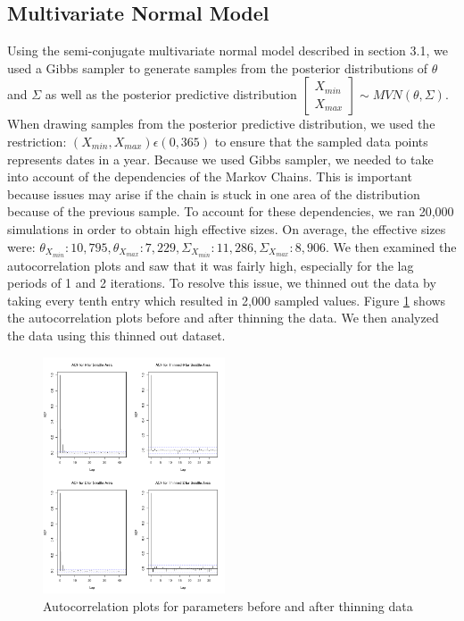 \documentclass{article}
\begin{document}
\subsection{Multivariate Normal Model}
Using the semi-conjugate multivariate normal model described in section 3.1, we used a Gibbs sampler to generate samples from the posterior distributions of $\theta$ and $\Sigma$ as well as the posterior predictive distribution $\begin{bmatrix} X_{min} \\ X_{max} \end{bmatrix}  \sim MVN(\theta, \Sigma)$. When drawing samples from the posterior predictive distribution, we used the restriction: $(X_{min} ,X_{max}) \epsilon (0,365)$ to ensure that the sampled data points represents dates in a year. Because we used Gibbs sampler, we needed to take into account of the dependencies of the Markov Chains. This is important because issues may arise if the chain is stuck in one area of the distribution because of the previous sample. To account for these dependencies, we ran 20,000 simulations in order to obtain high effective sizes. On average, the effective sizes were: $\theta_{X_{min}} : 10,795,  \theta_{X_{max}}: 7,229, \Sigma_{X_{min}}: 11,286, \Sigma_{X_{max}}: 8,906$. We then examined the autocorrelation plots and saw that it was fairly high, especially for the lag periods of 1 and 2 iterations. To resolve this issue, we thinned out the data by taking every tenth entry which resulted in 2,000 sampled values. Figure \ref{acfPlot} shows the autocorrelation plots before and after thinning the data. We then analyzed the data using this thinned out dataset.

\begin{figure}[H]
\includegraphics[width = .6\textwidth, height = 7cm]{acfplots}
\caption{Autocorrelation plots for parameters before and after thinning data}
\label{acfPlot}
\end{figure}
\end{document}
